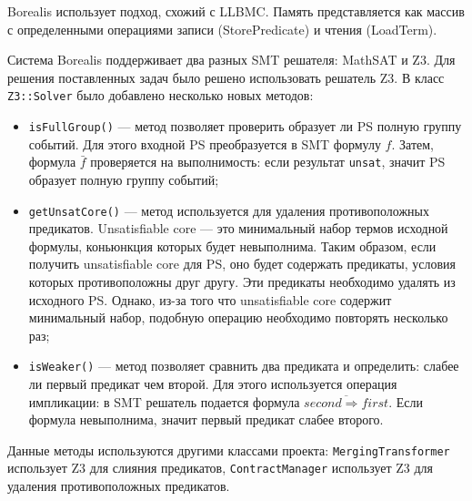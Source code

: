 Borealis использует подход, схожий с LLBMC\cite{llbmc}. Память представляется как массив с определенными операциями записи (StorePredicate) и чтения (LoadTerm)\cite{smtlib}.

Система Borealis поддерживает два разных SMT решателя: MathSAT\cite{mathsatsolver} и Z3. Для решения поставленных задач было решено использовать решатель Z3. В класс \texttt{Z3::Solver} было добавлено несколько новых методов:
\begin{itemize}
\item \texttt{isFullGroup()} --- метод позволяет проверить образует ли PS полную группу событий. Для этого входной PS преобразуется в SMT формулу $f$. Затем, формула $\bar{f}$ проверяется на выполнимость: если результат \texttt{unsat}, значит PS образует полную группу событий;
\item \texttt{getUnsatCore()} --- метод используется для удаления противоположных предикатов. Unsatisfiable core\cite{unsatcore} --- это минимальный набор термов исходной формулы, коньюнкция которых будет невыполнима. Таким образом, если получить unsatisfiable core для PS, оно будет содержать предикаты, условия которых противоположны друг другу. Эти предикаты необходимо удалять из исходного PS. Однако, из-за того что unsatisfiable core содержит минимальный набор, подобную операцию необходимо повторять несколько раз;
\item \texttt{isWeaker()} --- метод позволяет сравнить два предиката и определить: слабее ли первый предикат чем второй. Для этого используется операция импликации: в SMT решатель подается формула $\overline{second \Longrightarrow first}$. Если формула невыполнима, значит первый предикат слабее второго.
\end{itemize}

Данные методы используются другими классами проекта: \texttt{MergingTransformer} использует Z3 для слияния предикатов, \texttt{ContractManager} использует Z3 для удаления противоположных предикатов.